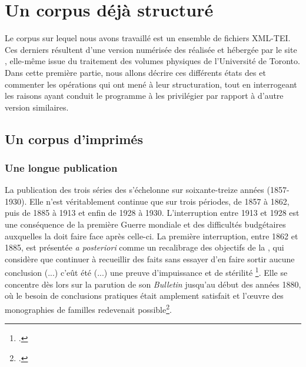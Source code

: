\part{Un corpus déjà structuré}

\clearpage
\thispagestyle{empty}
\cleardoublepage
{}
Le corpus sur lequel nous avons travaillé est un ensemble de fichiers XML-TEI. Ces derniers résultent d'une version numérisée des \odm{} réalisée et hébergée par le site \ia, elle-même issue du traitement des volumes physiques de l'Université de Toronto. Dans cette première partie, nous allons décrire ces différents états des \odm{} et commenter les opérations qui ont mené à leur structuration, tout en interrogeant les raisons ayant conduit le programme \timeus{} à les privilégier par rapport à d'autre version similaires.

\chapter{Un corpus d'imprimés}

\section{Une longue publication}
\label{part:I1_longue_pub}

La publication des trois séries des \odm{} s'échelonne sur soixante-treize années (1857-1930). Elle n'est véritablement continue que sur trois périodes, de 1857 à 1862, puis de 1885 à 1913 et enfin de 1928 à 1930. L'interruption entre 1913 et 1928 est une conséquence de la première Guerre mondiale et des difficultés budgétaires auxquelles la \sess{} doit faire face après celle-ci. La première interruption, entre 1862 et 1885, est présentée \textit{a posteriori} comme un recalibrage des objectifs de la \sess, qui considère que \og continuer à recueillir des faits sans essayer d'en faire sortir aucune conclusion (...) c'eût été (...) une preuve d'impuissance et de stérilité \fg{}\footcite[p. I]{averts1t5}. Elle se concentre dès lors sur la parution de son \textit{Bulletin} jusqu'au début des années 1880, où \og le besoin de conclusions pratiques était amplement satisfait \fg{} et \og  l'œuvre des monographies de familles \fg{} redevenait possible\footcite[p. II]{averts1t5}.


